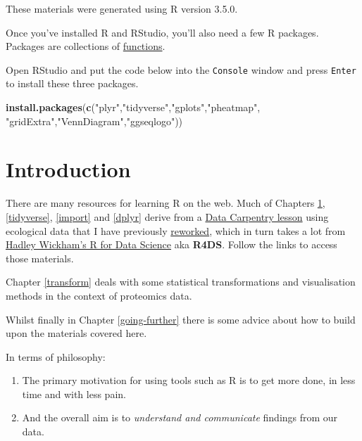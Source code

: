 \documentclass[12pt,]{book}
\newenvironment{Shaded}{\begin{snugshade}}{\end{snugshade}}
\newcommand{\KeywordTok}[1]{\textcolor[rgb]{0.13,0.29,0.53}{\textbf{#1}}}
\newcommand{\StringTok}[1]{\textcolor[rgb]{0.31,0.60,0.02}{#1}}
\newcommand{\NormalTok}[1]{#1}
\theoremstyle{definition}
\theoremstyle{definition}
\theoremstyle{definition}
\theoremstyle{remark}
\begin{document}
These materials were generated using R version 3.5.0.

Once you've installed R and RStudio, you'll also need a few R packages.
Packages are collections of
\protect\hyperlink{function-anatomy}{functions}.

Open RStudio and put the code below into the \texttt{Console} window and
press \texttt{Enter} to install these three packages.

\begin{Shaded}
\begin{Highlighting}[]
\KeywordTok{install.packages}\NormalTok{(}\KeywordTok{c}\NormalTok{(}\StringTok{"plyr"}\NormalTok{,}\StringTok{"tidyverse"}\NormalTok{,}\StringTok{"gplots"}\NormalTok{,}\StringTok{"pheatmap"}\NormalTok{,}
                   \StringTok{"gridExtra"}\NormalTok{,}\StringTok{"VennDiagram"}\NormalTok{,}\StringTok{"ggseqlogo"}\NormalTok{))}
\end{Highlighting}
\end{Shaded}

\chapter{Introduction}\label{intro}

There are many resources for learning R on the web. Much of Chapters
\ref{intro}, \ref{tidyverse}, \ref{import} and \ref{dplyr} derive from a
\href{http://www.datacarpentry.org/lessons/}{Data Carpentry lesson}
using ecological data that I have previously
\href{https://southampton-rsg.github.io/2017-08-01-southampton-dc/novice/R-ecology-lesson/index.html}{reworked},
which in turn takes a lot from \href{http://r4ds.had.co.nz/}{Hadley
Wickham's R for Data Science} aka \textbf{R4DS}. Follow the links to
access those materials.

Chapter \ref{transform} deals with some statistical transformations and
visualisation methods in the context of proteomics data.

Whilst finally in Chapter \ref{going-further} there is some advice about
how to build upon the materials covered here.

In terms of philosophy:

\begin{enumerate}
\def\labelenumi{\arabic{enumi}.}
\item
  The primary motivation for using tools such as R is to get more done,
  in less time and with less pain.
\item
  And the overall aim is to \emph{understand and communicate} findings
  from our data.
\end{enumerate}
\end{document}
